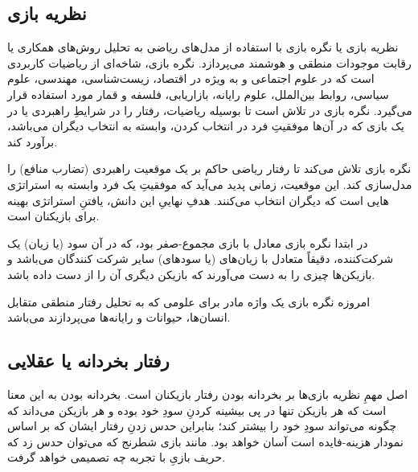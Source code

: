 \documentclass[12pt]{article}
\begin{document}
{{{{{{{{\subsection{نظریه بازی}

نظریه بازی یا نگره بازی با استفاده از مدل‌های ریاضی به تحلیل روش‌های همکاری یا رقابت موجودات منطقی و هوشمند می‌پردازد. نگره بازی، شاخه‌ای از ریاضیات کاربردی است که در علوم اجتماعی و به ویژه در اقتصاد، زیست‌شناسی، مهندسی، علوم سیاسی، روابط بین‌الملل، علوم رایانه، بازاریابی، فلسفه و قمار مورد استفاده قرار می‌گیرد. نگره بازی در تلاش است تا بوسیله ریاضیات، رفتار را در شرایطِ راهبردی یا در یک بازی که در آن‌ها موفقیتِ فرد در انتخاب کردن، وابسته به انتخاب دیگران می‌باشد، برآورد کند.

نگره بازی تلاش می‌کند تا رفتار ریاضی حاکم بر یک موقعیت راهبردی (تضارب منافع) را مدل‌سازی کند. این موقعیت، زمانی پدید می‌آید که موفقیتِ یک فرد وابسته به استراتژی هایی است که دیگران انتخاب می‌کنند. هدفِ نهاییِ این دانش، یافتنِ استراتژی بهینه برای بازیکنان است.

در ابتدا نگره بازی معادل با بازی مجموع-صفر بود، که در آن سود (یا زیان) یک شرکت‌کننده، دقیقاً متعادل با زیان‌های (یا سودهای) سایر شرکت کنندگان می‌باشد و بازیکن‌ها چیزی را به دست می‌آورند که بازیکن دیگری آن را از دست داده باشد.

امروزه نگره بازی یک واژه مادر برای علومی که به تحلیل رفتار منطقی متقابل انسان‌ها، حیوانات و رایانه‌ها می‌پردازند می‌باشد.

\subsection*{رفتار بخردانه یا عقلایی}

اصل مهمِ نظریه بازی‌ها بر بخردانه بودن رفتار بازیکنان است. بخردانه بودن به این معنا است که هر بازیکن تنها در پی بیشینه کردنِ سودِ خود بوده و هر بازیکن می‌داند که چگونه می‌تواند سودِ خود را بیشتر کند؛ بنابراین حدس زدنِ رفتار ایشان که بر اساس نمودار هزینه-فایده است آسان خواهد بود. مانند بازی شطرنج که می‌توان حدس زد که حریف بازیِ با تجربه چه تصمیمی خواهد گرفت.

}}}}}}}}
\end{document}
